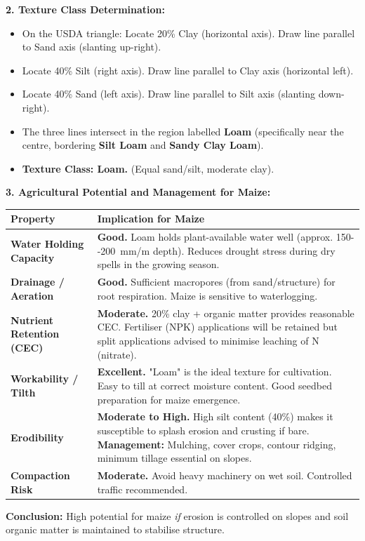 \documentclass[11pt]{article}
\begin{document}
\begin{exoresolu}
\noindent\textbf{2. Texture Class Determination:}
\begin{itemize}
\item On the USDA triangle: Locate 20\% Clay (horizontal axis). Draw line parallel to Sand axis (slanting up-right).
\item Locate 40\% Silt (right axis). Draw line parallel to Clay axis (horizontal left).
\item Locate 40\% Sand (left axis). Draw line parallel to Silt axis (slanting down-right).
\item The three lines intersect in the region labelled \textbf{Loam} (specifically near the centre, bordering \textbf{Silt Loam} and \textbf{Sandy Clay Loam}).
\item \textbf{Texture Class: Loam.} (Equal sand/silt, moderate clay).
\end{itemize}

\noindent\textbf{3. Agricultural Potential and Management for Maize:}
\begin{center}
\begin{tabularx}{\linewidth}{|l|X|}\hline
\rowcolor{popblueL}
\textbf{Property} & \textbf{Implication for Maize} \\ \hline
\textbf{Water Holding Capacity} & \textbf{Good.} Loam holds plant-available water well (approx. \SI{150--200}{mm/m} depth). Reduces drought stress during dry spells in the growing season. \\ \hline
\textbf{Drainage / Aeration} & \textbf{Good.} Sufficient macropores (from sand/structure) for root respiration. Maize is sensitive to waterlogging. \\ \hline
\textbf{Nutrient Retention (CEC)} & \textbf{Moderate.} 20\% clay + organic matter provides reasonable CEC. Fertiliser (NPK) applications will be retained but split applications advised to minimise leaching of N (nitrate). \\ \hline
\textbf{Workability / Tilth} & \textbf{Excellent.} "Loam" is the ideal texture for cultivation. Easy to till at correct moisture content. Good seedbed preparation for maize emergence. \\ \hline
\textbf{Erodibility} & \textbf{Moderate to High.} High silt content (40\%) makes it susceptible to splash erosion and crusting if bare. \textbf{Management:} Mulching, cover crops, contour ridging, minimum tillage essential on slopes. \\ \hline
\textbf{Compaction Risk} & \textbf{Moderate.} Avoid heavy machinery on wet soil. Controlled traffic recommended. \\ \hline
\end{tabularx}
\end{center}

\noindent\textbf{Conclusion:} High potential for maize \emph{if} erosion is controlled on slopes and soil organic matter is maintained to stabilise structure.
\end{exoresolu}
\end{document}
